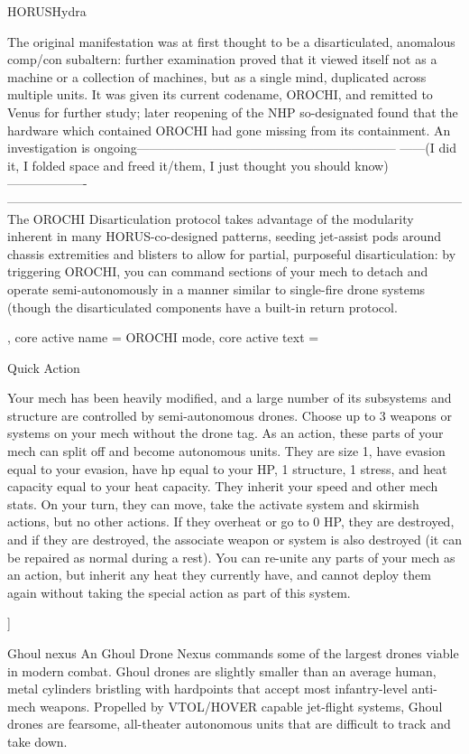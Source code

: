\begin{mech}{HORUS}{Hydra}
{The original manifestation was at first thought to be a disarticulated, anomalous comp/con subaltern: further examination proved that it viewed itself not as a machine or a collection of machines, but as a single mind, duplicated across multiple units. It was given its current codename, OROCHI, and remitted to Venus for further study; later reopening of the NHP so-designated found that the hardware which contained OROCHI had gone missing from its containment. An investigation is ongoing--------------------------------------------------------------
------(I did it, I folded space and freed it/them, I just thought you should know)-------------------
------------------------------------------------------------------------------------------------------------
The OROCHI Disarticulation protocol takes advantage of the modularity inherent in many HORUS-co-designed patterns, seeding jet-assist pods around chassis extremities and blisters to allow for partial, purposeful disarticulation: by triggering OROCHI, you can command sections of your mech to detach and operate semi-autonomously in a manner similar to single-fire drone systems (though the disarticulated components have a built-in return protocol.

},
core active name = OROCHI mode,
core active text = {Quick Action

Your mech has been heavily modified, and a large number of its subsystems and structure are controlled by semi-autonomous drones. Choose up to 3 weapons or systems on your mech without the drone tag. As an action, these parts of your mech can split off and become autonomous units. They are size 1, have evasion equal to your evasion, have hp equal to your HP, 1 structure, 1 stress, and heat capacity equal to your heat capacity. They inherit your speed and other mech stats. On your turn, they can move, take the activate system and skirmish actions, but no other actions. If they overheat or go to 0 HP, they are destroyed, and if they are destroyed, the associate weapon or system is also destroyed (it can be repaired as normal during a rest). You can re-unite any parts of your mech as an action, but inherit any heat they currently have, and cannot deploy them again without taking the special action as part of this system.
}]


Ghoul nexus
An Ghoul Drone Nexus commands some of the largest drones viable in modern combat. Ghoul drones are slightly smaller than an average human, metal cylinders bristling with hardpoints that accept most infantry-level anti-mech weapons. Propelled by VTOL/HOVER capable jet-flight systems, Ghoul drones are fearsome, all-theater autonomous units that are difficult to track and take down.


\end{mech}
